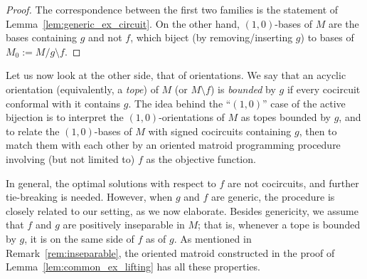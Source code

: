 \documentclass[12pt]{amsart}
\numberwithin{equation}{section}
\theoremstyle{definition}
\newcommand{\chiho}[1]{\todo[color=green!30]{\rm #1 \\ \hfill --- Ch.}}
\begin{document}
\begin{proof}
The correspondence between the first two families is the statement of Lemma~\ref{lem:generic_ex_circuit}.
On the other hand, $(1,0)$-bases of $M$ are the bases containing $g$ and not $f$, which biject (by removing/inserting $g$) to bases of $M_0:=M/g\setminus f$.
%
%    
\end{proof}

Let us now look at the other side, that of orientations.
%
We say that an acyclic orientation ({equivalently, a \em tope}) of $M$ (or $M\setminus f$) is {\em bounded} by $g$ if every cocircuit conformal with it contains $g$.
The idea behind the ``$(1,0)$'' case of the active bijection is to interpret the $(1,0)$-orientations of $M$ as topes bounded by $g$, and to relate the $(1,0)$-bases of $M$ with signed cocircuits containing $g$, then to match them with each other by an oriented matroid programming procedure involving (but not limited to) $f$ as the objective function.

In general, the optimal solutions with respect to $f$ are not cocircuits, and further tie-breaking is needed.
However, when $g$ and $f$ are  generic, the procedure is closely related to our setting, as we now elaborate.
%
Besides genericity, we assume that $f$ and $g$ are positively inseparable in $M$; that is, whenever a tope is bounded by $g$, it is on the same side of $f$ as of $g$. As mentioned in Remark~\ref{rem:inseparable}, the oriented matroid constructed in the proof of Lemma~\ref{lem:common_ex_lifting} has all these properties.
\end{document}
